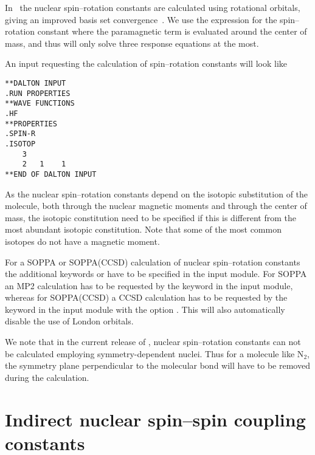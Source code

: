 In \siraba\ the nuclear spin--rotation
constants are calculated using
rotational orbitals, giving an improved
basis set convergence~\cite{jgkrthjcp105}. We use the
expression for the spin--rotation constant where the paramagnetic term
is evaluated around the center of mass, and thus will only solve three
response equations at the most.

An input requesting the calculation of spin--rotation constants will
look like

\begin{verbatim}
**DALTON INPUT
.RUN PROPERTIES
**WAVE FUNCTIONS
.HF
**PROPERTIES
.SPIN-R
.ISOTOP
    3
    2   1    1
**END OF DALTON INPUT
\end{verbatim}

As the nuclear spin--rotation constants
depend on the isotopic substitution of
the molecule, both through the nuclear magnetic moments and through the
center of mass, the isotopic constitution need to be specified if this
is different  from the most abundant isotopic constitution. Note that
some of the most common isotopes do not have a magnetic moment.

For a SOPPA or SOPPA(CCSD) calculation of
nuclear spin--rotation constants the additional keywords  or
 have to be specified in the  input
module. For SOPPA an MP2 calculation has to be requested by the keyword
 in the  input module, whereas for SOPPA(CCSD) a
CCSD calculation has to be requested by the keyword  in the  input module with the  option
. This will also automatically disable the use of London
orbitals.

We note that in the current release of \siraba , nuclear spin--rotation
constants can not be calculated employing symmetry-dependent
nuclei. Thus for a molecule like N$_2$, the symmetry plane
perpendicular to the molecular bond will have to be removed during the
calculation.

\section{Indirect nuclear spin--spin coupling
constants}\label{sec:spinspin}

